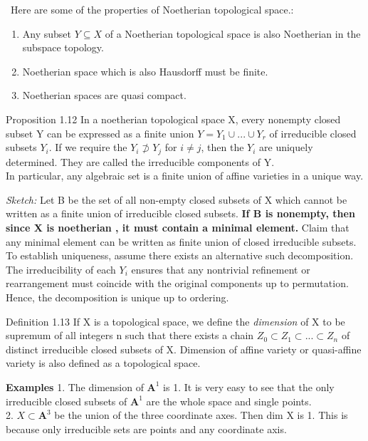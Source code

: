 \documentclass[12pt]{article}
\begin{document}
\begin{remarkBox}
\    Here are some of the properties of Noetherian topological space.:
\begin{enumerate}
    \item Any subset $Y \subseteq X$ of a Noetherian topological space is also Noetherian in the subspace topology.
    \item Noetherian space which is also Hausdorff must be finite.
    \item Noetherian spaces are quasi compact.
\end{enumerate}
\end{remarkBox}
\begin{propositionBox}{Proposition 1.12}
    In a noetherian topological space X, every nonempty closed subset Y can be expressed as a finite union $Y = Y_{1} \cup ... \cup Y_{r}$ of irreducible closed subsets $Y_{i}$. If we require the $Y_{i} \not\supset Y_{j}$  for $i \neq j$, then the $Y_{i}$ are uniquely determined. They are called the irreducible components of Y.\\
     In particular, any algebraic set is a finite union of affine varieties in a unique way.
\end{propositionBox}
\textit{Sketch:} Let B be the set of all non-empty closed subsets of X which cannot be written as a finite union of irreducible closed subsets. \textbf{If B is nonempty, then since X is noetherian , it must contain a minimal element.} Claim that any minimal element can be written as finite union of closed irreducible subsets.\\
To establish uniqueness, assume there exists an alternative such decomposition. The irreducibility of each $Y_{i}$ ensures that any nontrivial refinement or rearrangement must coincide with the original components up to permutation. Hence, the decomposition is unique up to ordering.
\begin{definitionBox}{Definition 1.13}
    If X is a topological space, we define the \textit{dimension} of X to be supremum of all integers n such that there exists a chain $Z_{0} \subset Z_{1} \subset ... \subset Z_{n}$ of distinct irreducible closed subsets of X. Dimension of affine variety or quasi-affine variety is also defined as a topological space.
\end{definitionBox}
\textbf{Examples} 1. The dimension of $\mathbf{A}^1$ is 1. It is very easy to see that the only irreducible closed subsets of $\mathbf{A}^1$ are the whole space and single points.\\
2. $X \subset \mathbf{A}^3$ be the union of the three coordinate axes. Then dim X is 1. This is because only irreducible sets are points and any coordinate axis.\\
\end{document}
